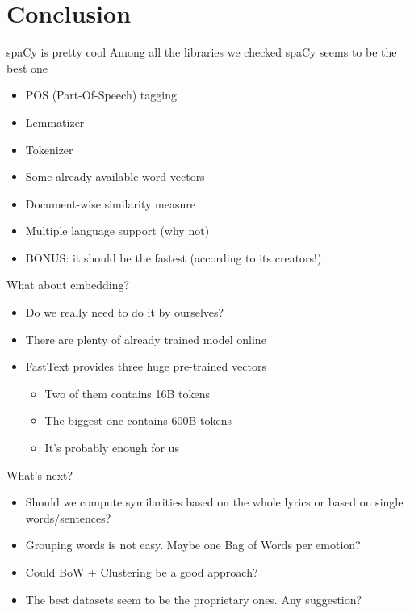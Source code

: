 \documentclass[xcolor=dvipsnames]{beamer}
\begin{document}
\section{Conclusion}

\begin{frame}{spaCy is pretty cool}
Among all the libraries we checked spaCy seems to be the best one
\begin{itemize}
\item POS (Part-Of-Speech) tagging
\item Lemmatizer
\item Tokenizer
\item Some already available word vectors
\item Document-wise similarity measure
\item Multiple language support (why not)
\item BONUS: it should be the fastest (according to its creators!)
\end{itemize}
\end{frame}

\begin{frame}{What about embedding?}
\begin{itemize}
\item Do we really need to do it by ourselves?
\item There are plenty of already trained model online
\item FastText provides three huge pre-trained vectors
\begin{itemize}
\item Two of them contains 16B tokens
\item The biggest one contains 600B tokens
\item It's probably enough for us
\end{itemize}
\end{itemize}
\end{frame}

\begin{frame}{What's next?}
\begin{itemize}
\item Should we compute symilarities based on the whole lyrics or based on single words/sentences?
\item Grouping words is not easy. Maybe one Bag of Words per emotion?
\item Could BoW + Clustering be a good approach?
\item The best datasets seem to be the proprietary ones. Any suggestion?
\end{itemize}
\end{frame}
\end{document}
